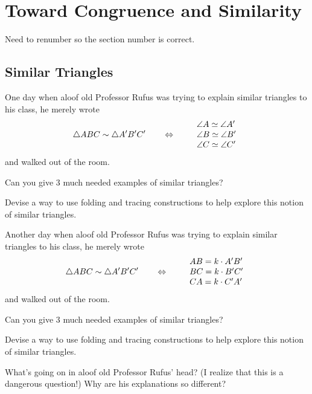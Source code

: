 
\newpage

\chapter{Toward Congruence and Similarity}
Need to renumber so the section number is correct. 

\section{Similar Triangles}

One day when aloof old Professor Rufus was trying to explain similar
triangles to his class, he merely wrote
\[
\triangle ABC \sim \triangle A'B'C' \qquad\Leftrightarrow \qquad\begin{array}{l}
\angle A \simeq \angle A'\\
\angle B \simeq \angle B' \\
\angle C \simeq \angle C'
\end{array}
\]
and walked out of the room.

\begin{question} 
Can you give $3$ much needed examples of similar triangles? 
\end{question}
\QM

\begin{question} 
Devise a way to use folding and tracing constructions to help explore this notion
of similar triangles.
\end{question}
\QM

Another day when aloof old Professor Rufus was trying to explain
similar triangles to his class, he merely wrote
\[
\triangle ABC \sim \triangle A'B'C' \qquad\Leftrightarrow \qquad
\begin{array}{l}
AB = k\cdot A'B'\\
BC = k\cdot B'C' \\
CA = k\cdot C'A'
\end{array}
\]
and walked out of the room.

\begin{question} 
Can you give $3$ much needed examples of similar triangles? 
\end{question}
\QM

\begin{question} 
Devise a way to use folding and tracing constructions to help explore this notion
of similar triangles.
\end{question}
\QM



\begin{question} 
What's going on in aloof old Professor Rufus' head?  (I realize that
this is a dangerous question!)  Why are his explanations so different?
\end{question}
\QM


